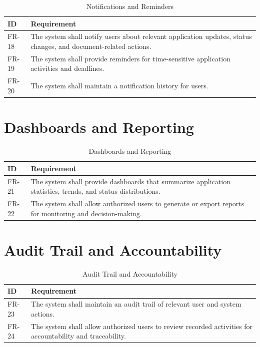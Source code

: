 \begin{table}[H]
\centering
\small
\caption{Notifications and Reminders}
\label{tab:fr_notifications}
\begin{tabular}{|p{2.2cm}|p{12cm}|}
\hline
\textbf{ID} & \textbf{Requirement} \\
\hline
FR-18 & The system shall notify users about relevant application updates, status changes, and document-related actions. \\
\hline
FR-19 & The system shall provide reminders for time-sensitive application activities and deadlines. \\
\hline
FR-20 & The system shall maintain a notification history for users. \\
\hline
\end{tabular}
\end{table}

\section{Dashboards and Reporting}

\begin{table}[H]
\centering
\small
\caption{Dashboards and Reporting}
\label{tab:fr_dashboards_reporting}
\begin{tabular}{|p{2.2cm}|p{12cm}|}
\hline
\textbf{ID} & \textbf{Requirement} \\
\hline
FR-21 & The system shall provide dashboards that summarize application statistics, trends, and status distributions. \\
\hline
FR-22 & The system shall allow authorized users to generate or export reports for monitoring and decision-making. \\
\hline
\end{tabular}
\end{table}

\section{Audit Trail and Accountability}

\begin{table}[H]
\centering
\small
\caption{Audit Trail and Accountability}
\label{tab:fr_audit_trail}
\begin{tabular}{|p{2.2cm}|p{12cm}|}
\hline
\textbf{ID} & \textbf{Requirement} \\
\hline
FR-23 & The system shall maintain an audit trail of relevant user and system actions. \\
\hline
FR-24 & The system shall allow authorized users to review recorded activities for accountability and traceability. \\
\hline
\end{tabular}
\end{table}

